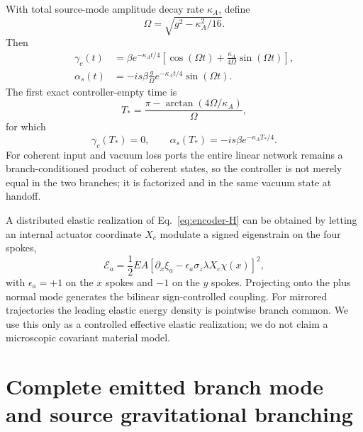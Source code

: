 \documentclass[11pt]{article}
\begin{document}
With total source-mode amplitude decay rate $\kappa_A$, define
\begin{equation}
\Omega=\sqrt{g^2-\kappa_A^2/16}.
\end{equation}
Then
\begin{align}
\gamma_c(t)
&=\beta e^{-\kappa_A t/4}
\left[
\cos(\Omega t)
+\frac{\kappa_A}{4\Omega}\sin(\Omega t)
\right],\\
\alpha_s(t)
&=-is\beta\frac{g}{\Omega}
 e^{-\kappa_A t/4}\sin(\Omega t).
\end{align}
The first exact controller-empty time is
\begin{equation}
\boxed{
T_*
=\frac{\pi-\arctan(4\Omega/\kappa_A)}{\Omega},
}
\label{eq:Tstar}
\end{equation}
for which
\begin{equation}
\gamma_c(T_*)=0,
\qquad
\alpha_s(T_*)=-is\beta e^{-\kappa_A T_*/4}.
\end{equation}
For coherent input and vacuum loss ports the entire linear network remains a branch-conditioned product of coherent states, so the controller is not merely equal in the two branches; it is factorized and in the same vacuum state at handoff.

A distributed elastic realization of Eq.~\eqref{eq:encoder-H} can be obtained by letting an internal actuator coordinate $X_c$ modulate a signed eigenstrain on the four spokes,
\begin{equation}
\mathcal E_a
=\frac12EA
\left[
\partial_x\xi_a
-\epsilon_a\sigma_z\lambda X_c\chi(x)
\right]^2,
\end{equation}
with $\epsilon_a=+1$ on the $x$ spokes and $-1$ on the $y$ spokes. Projecting onto the plus normal mode generates the bilinear sign-controlled coupling. For mirrored trajectories the leading elastic energy density is pointwise branch common. We use this only as a controlled effective elastic realization; we do not claim a microscopic covariant material model.

\section{Complete emitted branch mode and source gravitational branching}
\label{sec:source-output}
\end{document}

